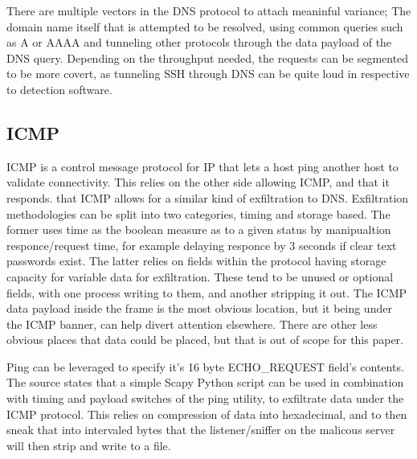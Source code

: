 There are multiple vectors in the DNS protocol to attach meaninful variance; 
The domain name itself that is attempted to be resolved, using common queries such as A or AAAA and tunneling other protocols 
through the data payload of the DNS query. Depending on the throughput needed, the requests can be segmented to be more covert, as tunneling 
SSH through DNS can be quite loud in respective to detection software. \citep{DNSExfiltration}



\subsection{ICMP}
ICMP is a control message protocol for IP that lets a host ping another host to validate connectivity. This relies on the other side allowing ICMP, and that it responds. that ICMP allows for a similar kind of exfiltration to DNS. Exfiltration methodologies can be split into two categories, timing and storage based. The former uses time as the boolean measure as to a given status by manipualtion responce/request time, for example delaying responce by 3 seconds if clear text passwords exist.
The latter relies on fields within the protocol having storage capacity for variable data for exfiltration. These tend to be unused or optional fields, with one process writing to them, and another stripping it out. The ICMP data payload inside the frame is the most obvious location, but it being under the ICMP banner, can help divert attention elsewhere. There are other less obvious places that data could be placed, but that is out of scope for this paper. \citep{ICMPExfiltration}

Ping can be leveraged to specify it's 16 byte ECHO\_REQUEST field's contents. The source states that a simple Scapy Python script can be used in combination with timing and payload switches of the ping utility, to exfiltrate data under the ICMP protocol. This relies on compression of data into hexadecimal, and to then sneak that into intervaled bytes that the listener/sniffer on the malicous server will then strip and write to a file. \citep{pingExfil}



